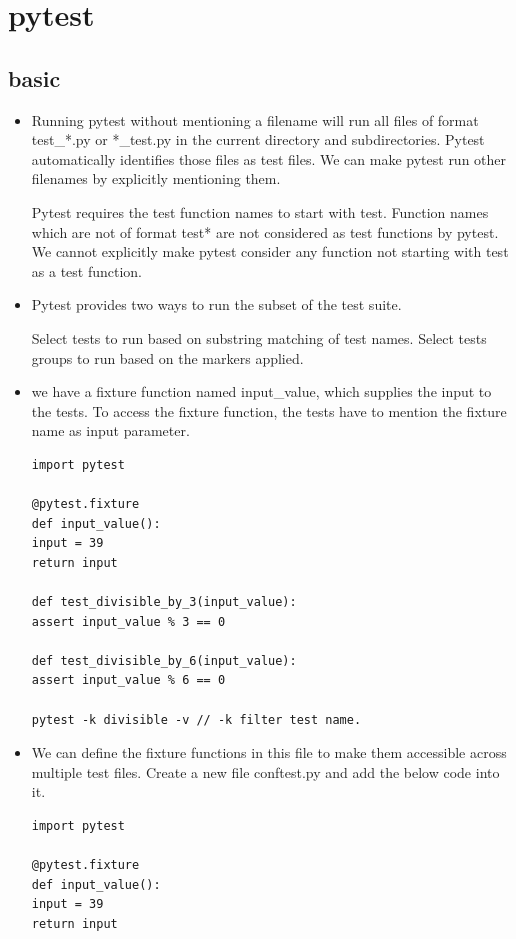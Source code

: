 \documentclass[a4paper,11pt,twoside]{book}
\begin{document}
\section{pytest}
\subsection{basic}
\begin{itemize}
	\item Running pytest without mentioning a filename will run all files of format test\_*.py or *\_test.py in the current directory and subdirectories. Pytest automatically identifies those files as test files. We can make pytest run other filenames by explicitly mentioning them.
	
	Pytest requires the test function names to start with test. Function names which are not of format test* are not considered as test functions by pytest. We cannot explicitly make pytest consider any function not starting with test as a test function.
	
	\item Pytest provides two ways to run the subset of the test suite.
	
	Select tests to run based on substring matching of test names.
	Select tests groups to run based on the markers applied.
	
	\item  we have a fixture function named input\_value, which supplies the input to the tests. To access the fixture function, the tests have to mention the fixture name as input parameter.
\begin{lstlisting}
import pytest

@pytest.fixture
def input_value():
input = 39
return input

def test_divisible_by_3(input_value):
assert input_value % 3 == 0

def test_divisible_by_6(input_value):
assert input_value % 6 == 0	

pytest -k divisible -v // -k filter test name.
\end{lstlisting}

\item We can define the fixture functions in this file to make them accessible across multiple test files.
Create a new file conftest.py and add the below code into it.
\begin{lstlisting}
import pytest

@pytest.fixture
def input_value():
input = 39
return input
\end{lstlisting}


\end{itemize}
\end{document}
